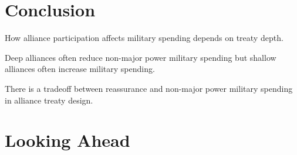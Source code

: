 \documentclass[12pt]{beamer}
\begin{document}

\section{Conclusion}


\begin{frame}[standout]

How alliance participation affects military spending depends on treaty depth.  

\end{frame}

 \begin{frame}[standout]

Deep alliances often reduce non-major power military spending but shallow alliances often increase military spending. 

 \end{frame}
 
 
 \begin{frame}[standout]

There is a tradeoff between reassurance and non-major power military spending in alliance treaty design. 

 \end{frame}



\section{Looking Ahead}

\end{document}
